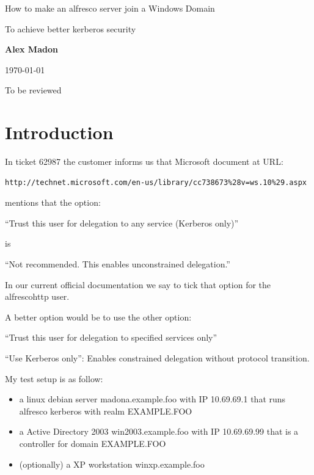 \documentclass[12pt,a4]{article}
\begin{document}
\begin{center}
{\Large How to make an alfresco server join a Windows Domain}

\vspace{5mm}

\Large{To achieve better kerberos security}

\vspace{5mm}
{\bf Alex Madon}
\vspace{5mm}

\today

\vspace{15mm}
{\huge To be reviewed}

\end{center}
\vspace{5mm}

\newpage

\tableofcontents

\newpage

\section{Introduction}
In ticket 62987 the customer informs us that Microsoft document at URL:
\begin{verbatim}
http://technet.microsoft.com/en-us/library/cc738673%28v=ws.10%29.aspx
\end{verbatim}
mentions that the option:

``Trust this user for delegation to any service (Kerberos only)''
	
is

``Not recommended. This enables unconstrained delegation.''


In our current official documentation we say to tick that option for the alfrescohttp user.

A better option would be to use the other option:

``Trust this user for delegation to specified services only''
	

    ``Use Kerberos only'': Enables constrained delegation without protocol transition.

My test setup is as follow:
\begin{itemize}
\item a linux debian server madona.example.foo with IP 10.69.69.1 that runs alfresco kerberos with realm EXAMPLE.FOO 
\item a Active Directory 2003 win2003.example.foo with IP 10.69.69.99 that is a controller for domain EXAMPLE.FOO
\item (optionally) a XP workstation winxp.example.foo

\end{itemize}
\end{document}
